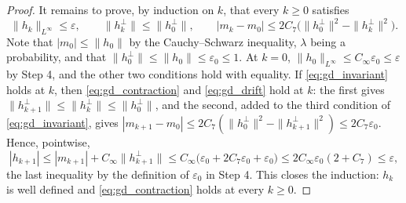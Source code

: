 \begin{proof}
It remains to prove, by induction on $k$, that every $k\geq0$ satisfies
\begin{equation}\label{eq:gd_invariant}
    \|h_k\|_{L^\infty}\leq\varepsilon,\qquad \|h^\perp_k\|\leq\|h^\perp_0\|,\qquad |m_k-m_0|\leq2C_7\bigl(\|h^\perp_0\|^2-\|h^\perp_k\|^2\bigr).
\end{equation}
Note that $|m_0|\leq\|h_0\|$ by the Cauchy--Schwarz inequality, $\lambda$ being a probability, and that $\|h^\perp_0\|\leq\|h_0\|\leq\varepsilon_0\leq1$. At $k=0$, $\|h_0\|_{L^\infty}\leq C_\infty\varepsilon_0\leq\varepsilon$ by Step 4, and the other two conditions hold with equality. If \eqref{eq:gd_invariant} holds at $k$, then \eqref{eq:gd_contraction} and \eqref{eq:gd_drift} hold at $k$: the first gives $\|h^\perp_{k+1}\|\leq\|h^\perp_k\|\leq\|h^\perp_0\|$, and the second, added to the third condition of \eqref{eq:gd_invariant}, gives $|m_{k+1}-m_0|\leq2C_7(\|h^\perp_0\|^2-\|h^\perp_{k+1}\|^2)\leq2C_7\varepsilon_0$. Hence, pointwise,
\begin{equation*}
    |h_{k+1}|\leq|m_{k+1}|+C_\infty\|h^\perp_{k+1}\|\leq C_\infty\bigl(\varepsilon_0+2C_7\varepsilon_0+\varepsilon_0\bigr)\leq2C_\infty\varepsilon_0(2+C_7)\leq\varepsilon,
\end{equation*}
the last inequality by the definition of $\varepsilon_0$ in Step 4. This closes the induction: $h_k$ is well defined and \eqref{eq:gd_contraction} holds at every $k\geq0$.
\end{proof}

